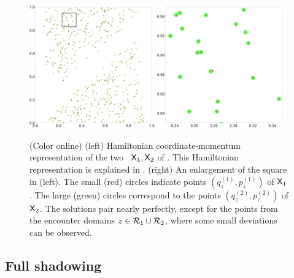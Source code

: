 \documentclass[12pt]{iopart}
\begin{document}
\begin{figure}
\begin{center}
   \includegraphics[width=0.48\textwidth]
{AKSs13TwoBlocksG1}
   \includegraphics[width=0.48\textwidth]
{AKSs13TwoBlocksG2}
\end{center}
\caption[]{\label{fig:AKSs13TwoBlocks}
(Color online)
(left)
Hamiltonian coordinate-\-momentum representation of the two \twots\
$\mathsf{X}_1, \mathsf{X}_2$ of . This Hamiltonian
representation is explained in .
(right)
An enlargement of the square in (left).  The small (red)  circles indicate
points  $(q^{(1)}_z, p^{(1)}_z)$  of   $\mathsf{X}_1$. The large  (green)
circles correspond to the  points $(q^{(2)}_z, p^{(2)}_z)$  of   $\mathsf{X}_2$.
The solutions pair nearly perfectly, except for the points
from the encounter domains $z\in \mathcal{R}_1\cup \mathcal{R}_2$,  where some small
deviations can be  observed.
    }
\end{figure}


\subsection{Full shadowing}
\label{sect:fullShade}
\end{document}
